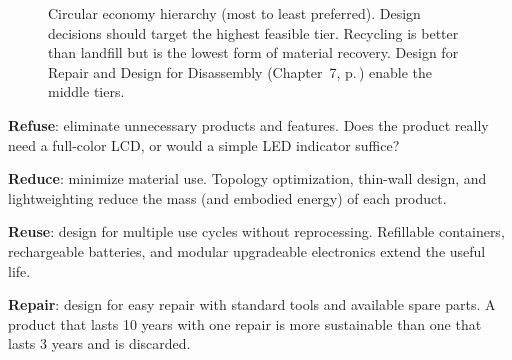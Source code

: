 \begin{figure}[htbp]\centering
{}
\caption{Circular economy hierarchy (most to least preferred). Design decisions should target the highest feasible tier. Recycling is better than landfill but is the lowest form of material recovery. Design for Repair and Design for Disassembly (Chapter~7, p.\,\pageref{ch:oandm}) enable the middle tiers.}\label{fig:circular_hierarchy}
\end{figure}

\textbf{Refuse}: eliminate unnecessary products and features. Does the product really need a full-color LCD, or would a simple LED indicator suffice?

\textbf{Reduce}: minimize material use. Topology optimization, thin-wall design, and lightweighting reduce the mass (and embodied energy) of each product.

\textbf{Reuse}: design for multiple use cycles without reprocessing. Refillable containers, rechargeable batteries, and modular upgradeable electronics extend the useful life.

\textbf{Repair}: design for easy repair with standard tools and available spare parts. A product that lasts 10 years with one repair is more sustainable than one that lasts 3 years and is discarded.

